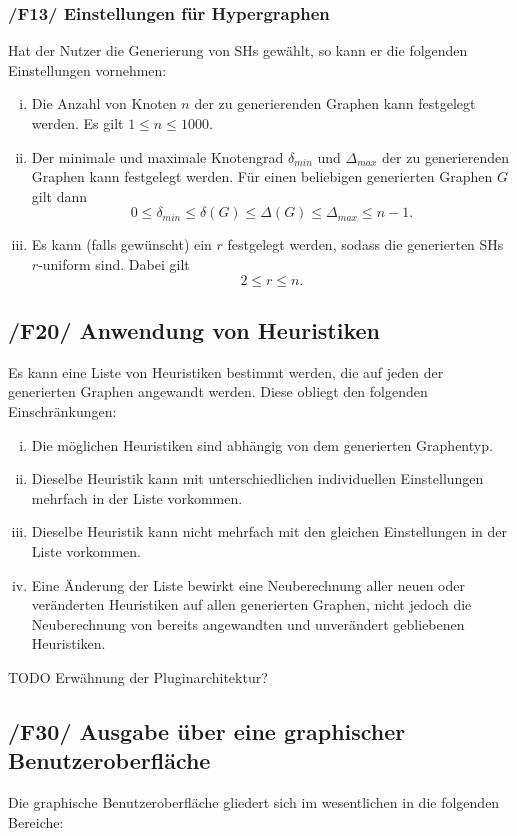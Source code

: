 \documentclass{article}
\begin{document}
	\subsubsection*{/F13/ Einstellungen für Hypergraphen}
	Hat der Nutzer die Generierung von SHs gewählt, so kann er die folgenden Einstellungen vornehmen:
	\begin{enumerate}[i)]
		\item{Die Anzahl von Knoten $n$ der zu generierenden Graphen kann festgelegt werden. Es gilt $1 \leq n \leq 1000$.}
		\item{Der minimale und maximale Knotengrad $\delta_{min}$ und $\Delta_{max}$ der zu generierenden Graphen kann festgelegt werden. Für einen beliebigen generierten Graphen $G$ gilt dann $$0 \leq \delta_{min} \leq \delta(G) \leq \Delta(G) \leq \Delta_{max} \leq n-1.$$}
		\item{Es kann (falls gewünscht) ein $r$ festgelegt werden, sodass die generierten SHs $r$-uniform sind. Dabei gilt $$2 \leq r \leq n.$$}
	\end{enumerate}
	
	
	\subsection*{/F20/ Anwendung von Heuristiken}
	Es kann eine Liste von Heuristiken bestimmt werden, die auf jeden der generierten Graphen angewandt werden. Diese obliegt den folgenden Einschränkungen:
	\begin{enumerate}[i)]
		\item{Die möglichen Heuristiken sind abhängig von dem generierten Graphentyp.}
		\item{Dieselbe Heuristik kann mit unterschiedlichen individuellen Einstellungen mehrfach in der Liste vorkommen.}
		\item{Dieselbe Heuristik kann nicht mehrfach mit den gleichen Einstellungen in der Liste vorkommen.}
		\item{Eine Änderung der Liste bewirkt eine Neuberechnung aller neuen oder veränderten Heuristiken auf allen generierten Graphen, nicht jedoch die Neuberechnung von bereits angewandten und unverändert gebliebenen Heuristiken.}
	\end{enumerate}
	
	TODO Erwähnung der Pluginarchitektur?
	
	
	\subsection*{/F30/ Ausgabe über eine graphischer Benutzeroberfläche}
	Die graphische Benutzeroberfläche gliedert sich im wesentlichen in die folgenden Bereiche:
	
\end{document}
